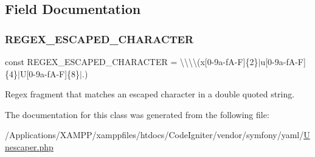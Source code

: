 \subsection{Field Documentation}
\mbox{\label{class_symfony_1_1_component_1_1_yaml_1_1_unescaper_a5356e3ed7b9c99d134587dc04ca30e45}} 
\subsubsection{\texorpdfstring{R\+E\+G\+E\+X\+\_\+\+E\+S\+C\+A\+P\+E\+D\+\_\+\+C\+H\+A\+R\+A\+C\+T\+ER}{REGEX\_ESCAPED\_CHARACTER}}
{\footnotesize\ttfamily const R\+E\+G\+E\+X\+\_\+\+E\+S\+C\+A\+P\+E\+D\+\_\+\+C\+H\+A\+R\+A\+C\+T\+ER = \textquotesingle{}\textbackslash{}\textbackslash{}\textbackslash{}\textbackslash{}(x\mbox{[}0-\/9a-\/f\+A-\/\+F\mbox{]}\{2\}$\vert$u\mbox{[}0-\/9a-\/f\+A-\/\+F\mbox{]}\{4\}$\vert$\+U\mbox{[}0-\/9a-\/f\+A-\/\+F\mbox{]}\{8\}$\vert$.)\textquotesingle{}}

Regex fragment that matches an escaped character in a double quoted string. 

The documentation for this class was generated from the following file\+:\begin{DoxyCompactItemize}
\item 
/\+Applications/\+X\+A\+M\+P\+P/xamppfiles/htdocs/\+Code\+Igniter/vendor/symfony/yaml/\mbox{\hyperlink{_unescaper_8php}{Unescaper.\+php}}\end{DoxyCompactItemize}
